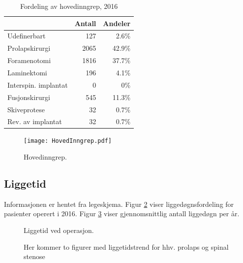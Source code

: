 \documentclass [norsk,a4paper,twoside]{article}\usepackage[]{graphicx}\usepackage[]{color}
\begin{document}
\begin{table}[ht]
\centering
\begin{tabular}{lrr}
  \hline
 & Antall & Andeler \\ 
  \hline
Udefinerbart & 127 & 2.6\% \\ 
  Prolapskirurgi & 2065 & 42.9\% \\ 
  Foramenotomi & 1816 & 37.7\% \\ 
  Laminektomi & 196 & 4.1\% \\ 
  Interspin. implantat & 0 & 0\% \\ 
  Fusjonskirurgi & 545 & 11.3\% \\ 
  Skiveprotese & 32 & 0.7\% \\ 
  Rev. av implantat & 32 & 0.7\% \\ 
   \hline
\end{tabular}
\caption{Fordeling av hovedinngrep, 2016} 
\label{tab:AntHovedInngrep}
\end{table}



\begin{figure}[ht]
	\centering \texttt{[image: HovedInngrep.pdf]}
	\caption{\label{fig:HovedInngrep} Hovedinngrep.}
\end{figure}




\subsection{Liggetid}

Informasjonen er hentet fra legeskjema.
Figur \ref{fig:Liggedogn} viser liggedøgnsfordeling for pasienter operert i 2016. Figur \ref{fig:LiggedognTid} viser gjennomsnittlig antall liggedøgn per år.  




\begin{figure}[h] 
\centerline{
  }
  \caption{Liggetid ved operasjon.}
  \label{fig:Liggedogn}
\end{figure}

\begin{figure}[h] 
\centerline{
  }
  \caption{Her kommer to figurer med liggetidstrend for hhv. prolaps og spinal stenose}
  \label{fig:LiggedognTid}
\end{figure}
\end{document}
